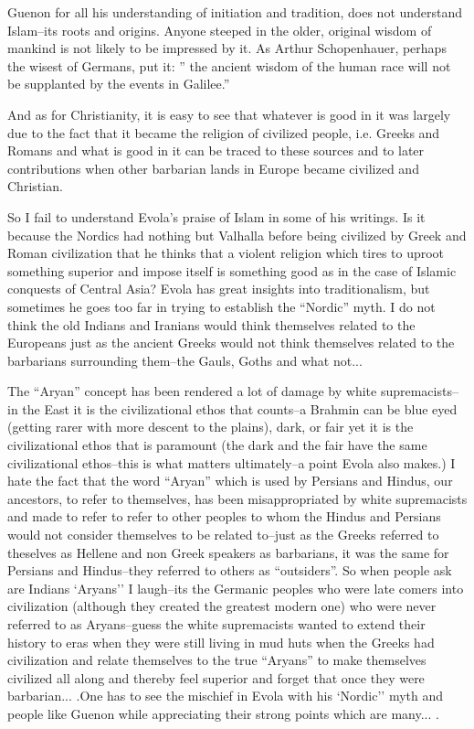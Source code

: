 \begin{footnotesize}
\begin{sffamily}
Guenon for all his understanding of initiation and tradition, does not understand Islam--its roots and origins. Anyone steeped in the older, original wisdom of mankind is not likely to be impressed by it. As Arthur Schopenhauer, perhaps the wisest of Germans, put it: '' the ancient wisdom of the human race will not be supplanted by the events in Galilee.''

And as for Christianity, it is easy to see that whatever is good in it was largely due to the fact that it became the religion of civilized people, i.e. Greeks and Romans and what is good in it can be traced to these sources and to later contributions when other barbarian lands in Europe became civilized and Christian.

So I fail to understand Evola's praise of Islam in some of his writings. Is it because the Nordics had nothing but Valhalla before being civilized by Greek and Roman civilization that he thinks that a violent religion which tires to uproot something superior and impose itself is something good as in the case of Islamic conquests of Central Asia? Evola has great insights into traditionalism, but sometimes he goes too far in trying to establish the ``Nordic'' myth. I do not think the old Indians and Iranians would think themselves related to the Europeans just as the ancient Greeks would not think themselves related to the barbarians surrounding them--the Gauls, Goths and what not... 

The ``Aryan'' concept has been rendered a lot of damage by white supremacists--in the East it is the civilizational ethos that counts--a Brahmin can be blue eyed (getting rarer with more descent to the plains), dark, or fair yet it is the civilizational ethos that is paramount (the dark and the fair have the same civilizational ethos--this is what matters ultimately--a point Evola also makes.) I hate the fact that the word ``Aryan'' which is used by Persians and Hindus, our ancestors, to refer to themselves, has been misappropriated by white supremacists and made to refer to refer to other peoples to whom the Hindus and Persians would not consider themselves to be related to--just as the Greeks referred to theselves as Hellene and non Greek speakers as barbarians, it was the same for Persians and Hindus--they referred to others as ``outsiders''. So when people ask are Indians `Aryans'' I laugh--its the Germanic peoples who were late comers into civilization (although they created the greatest modern one) who were never referred to as Aryans--guess the white supremacists wanted to extend their history to eras when they were still living in mud huts when the Greeks had civilization and relate themselves to the true ``Aryans'' to make themselves civilized all along and thereby feel superior and forget that once they were barbarian... .One has to see the mischief in Evola with his `Nordic'' myth and people like Guenon while appreciating their strong points which are many... .


\end{sffamily}
\end{footnotesize}
